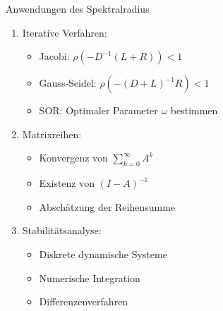 \begin{KR}{Anwendungen des Spektralradius}
\begin{enumerate}
    \item Iterative Verfahren:
    \begin{itemize}
        \item Jacobi: $\rho(-D^{-1}(L+R)) < 1$
        \item Gauss-Seidel: $\rho(-(D+L)^{-1}R) < 1$
        \item SOR: Optimaler Parameter $\omega$ bestimmen
    \end{itemize}
    
    \item Matrixreihen:
    \begin{itemize}
        \item Konvergenz von $\sum_{k=0}^\infty A^k$
        \item Existenz von $(I-A)^{-1}$
        \item Abschätzung der Reihensumme
    \end{itemize}
    
    \item Stabilitätsanalyse:
    \begin{itemize}
        \item Diskrete dynamische Systeme
        \item Numerische Integration
        \item Differenzenverfahren
    \end{itemize}
\end{enumerate}
\end{KR}

